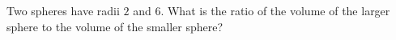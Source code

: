 Two spheres have radii $2$ and $6$. What is the ratio of the volume of the larger sphere to the volume of the smaller sphere?
